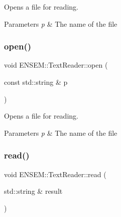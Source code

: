 Opens a file for reading. 


\begin{DoxyParams}{Parameters}
{\em p} & The name of the file \\
\hline
\end{DoxyParams}
\mbox{\label{classENSEM_1_1TextReader_a167e412dc7a3a56fae35ccb4cc9d9029}} 
\subsubsection{\texorpdfstring{open()}{open()}\hspace{0.1cm}{\footnotesize\ttfamily [3/3]}}
{\footnotesize\ttfamily void E\+N\+S\+E\+M\+::\+Text\+Reader\+::open (\begin{DoxyParamCaption}\item[{const std\+::string \&}]{p }\end{DoxyParamCaption})}



Opens a file for reading. 


\begin{DoxyParams}{Parameters}
{\em p} & The name of the file \\
\hline
\end{DoxyParams}
\mbox{\label{classENSEM_1_1TextReader_acbeb934e3316e4cf0c74d23dbe473d19}} 
\subsubsection{\texorpdfstring{read()}{read()}\hspace{0.1cm}{\footnotesize\ttfamily [1/33]}}
{\footnotesize\ttfamily void E\+N\+S\+E\+M\+::\+Text\+Reader\+::read (\begin{DoxyParamCaption}\item[{std\+::string \&}]{result }\end{DoxyParamCaption})}

\mbox{\label{classENSEM_1_1TextReader_acbeb934e3316e4cf0c74d23dbe473d19}} 
